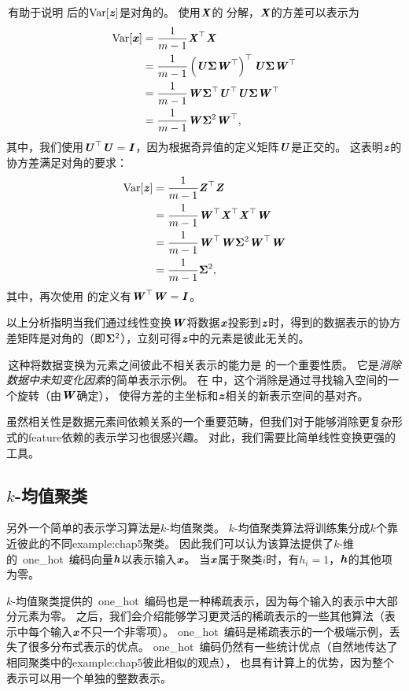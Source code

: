 
\,有助于说明\,\,后的$\text{Var}[\Vz]$是对角的。
使用$\MX$的\,\,分解，$\MX$的方差可以表示为
\begin{align}
    \text{Var}[\Vx] &= \frac{1}{m-1} \MX^\Tsp\MX \\
    &= \frac{1}{m-1} \left( \MU\VSigma \MW^\Tsp \right)^\Tsp \MU\VSigma \MW^\Tsp \\
    &= \frac{1}{m-1} \MW \VSigma^\Tsp \MU^\Tsp \MU\VSigma \MW^\Tsp \\
    &= \frac{1}{m-1} \MW \VSigma^2 \MW^\Tsp ,
\end{align}
其中，我们使用$\MU^\Tsp\MU = \MI$，因为根据奇异值的定义矩阵$\MU$是正交的。
这表明$\Vz$的协方差满足对角的要求：
\begin{align}
    \text{Var}[\Vz] &= \frac{1}{m-1} \MZ^\Tsp\MZ \\
    &= \frac{1}{m-1} \MW^\Tsp \MX^\Tsp \MX^\Tsp \MW \\
    &= \frac{1}{m-1} \MW^\Tsp\MW \VSigma^2 \MW^\Tsp\MW \\
    &= \frac{1}{m-1} \VSigma^2 ,
\end{align}
其中，再次使用\,\,的定义有$\MW^\Tsp\MW = \MI$。

以上分析指明当我们通过线性变换$\MW$将数据$\Vx$投影到$\Vz$时，得到的数据表示的协方差矩阵是对角的（即$\VSigma^2$），立刻可得$\Vz$中的元素是彼此无关的。

\,这种将数据变换为元素之间彼此不相关表示的能力是\,\,的一个重要性质。
它是\emph{消除数据中未知变化因素}的简单表示示例。
在\,\,中，这个消除是通过寻找输入空间的一个旋转（由$\MW$确定），
使得方差的主坐标和$\Vz$相关的新表示空间的基对齐。


虽然相关性是数据元素间依赖关系的一个重要范畴，但我们对于能够消除更复杂形式的\gls{feature}依赖的表示学习也很感兴趣。
对此，我们需要比简单线性变换更强的工具。

\subsection{$k$-均值聚类}
\label{sec:k_means_clustering}
另外一个简单的表示学习算法是$k$-均值聚类。
$k$-均值聚类算法将训练集分成$k$个靠近彼此的不同\gls{example:chap5}聚类。
因此我们可以认为该算法提供了$k$-维的~\gls{one_hot}~编码向量$\Vh$以表示输入$\Vx$。
当$\Vx$属于聚类$i$时，有$h_i=1$，$\Vh$的其他项为零。

$k$-均值聚类提供的~\gls{one_hot}~编码也是一种稀疏表示，因为每个输入的表示中大部分元素为零。
之后，我们会介绍能够学习更灵活的稀疏表示的一些其他算法（表示中每个输入$\Vx$不只一个非零项）。
\gls{one_hot}~编码是稀疏表示的一个极端示例，丢失了很多分布式表示的优点。
\gls{one_hot}~编码仍然有一些统计优点（自然地传达了相同聚类中的\gls{example:chap5}彼此相似的观点），
也具有计算上的优势，因为整个表示可以用一个单独的整数表示。

